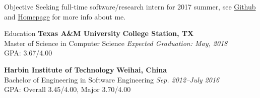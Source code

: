 \documentclass{resume} %
\begin{document}
\begin{rSection}{Objective}
Seeking full-time software/research intern for 2017 summer, see \href{https://github.com/vincenttsang}{Github} and \href{https://parasol.tamu.edu/~yzeng/}{Homepage} for more info about me.
\end{rSection}

\begin{rSection}{Education}
{\bf Texas A\&M University} \hfill {\bf College Station, TX} 
\\ Master of Science in Computer Science \hfill {\em Expected Graduation: May, 2018}
\\ GPA: 3.67/4.00
\vspace*{-0.2em}

{\bf Harbin Institute of Technology} \hfill {\bf Weihai, China} 
\\ Bachelor of Engineering in Software Engineering \hfill {\em Sep. 2012--July 2016}
\\ GPA: Overall 3.45/4.00, Major 3.70/4.00



\end{rSection}



\end{document}
